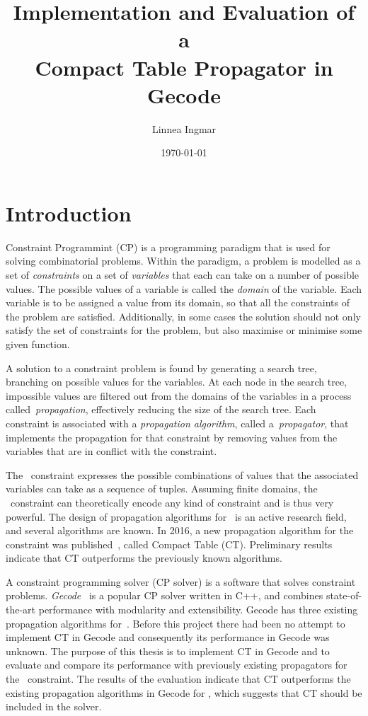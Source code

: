 \documentclass[a4paper,11pt]{article}
\title{\textbf{Implementation and Evaluation of a\\
    Compact Table Propagator in Gecode
  }
}
\author{Linnea Ingmar} %
\date{\today}
\newcommand{\Table}{\Constraint{Table}}
\newcommand{\CTpaper}[0]{DBLP:conf/cp/DemeulenaereHLP16}
\numberwithin{equation}{section}
\begin{document}
\maketitle

\tableofcontents

\newpage

\section{Introduction}
\label{intro}


Constraint Programmint (CP) is a programming paradigm that is used for solving
combinatorial problems. Within the paradigm, a problem is
modelled as a set of \emph{constraints} on a
set of \emph{variables} that each can take on a number of
possible values. The possible values of 
a variable is called the \emph{domain} of the variable.
Each variable is to be assigned a value
from its domain, so that all the constraints of the problem
are satisfied. Additionally, in some cases the solution should not only
satisfy the set of constraints for the
problem, but also maximise or minimise some given function.


A solution to a constraint problem is found by generating a search
tree, branching on possible values for the variables. At each node
in the search tree, impossible values are filtered out from the domains
of the variables in a process called~\emph{propagation}, effectively
reducing the size of the search tree.
Each constraint is associated with a \emph{propagation algorithm},
called a~\emph{propagator},
that implements the propagation for that constraint by removing
values from the variables that are in conflict with the constraint.

The \Table~constraint expresses the possible combinations of values
that the associated variables can take as a sequence of tuples.
Assuming finite domains, the \Table~constraint can theoretically
encode any kind of constraint and is thus very powerful. 
The design of propagation algorithms for \Table~is an active research field,
and several algorithms are known. In 2016, a new propagation algorithm for the \Table
constraint was published~\cite{\CTpaper}, called Compact Table (CT).
Preliminary results indicate that CT outperforms the previously known algorithms.

A constraint programming solver (CP solver) is a software that solves constraint problems.
\emph{Gecode}~\cite{Gecode} is a popular CP solver written in C++, and combines
state-of-the-art performance with modularity and extensibility.
Gecode has three existing propagation algorithms for~\Table.
Before this project there had been no attempt to implement CT in Gecode
and consequently its performance in Gecode was unknown. 
The purpose of this thesis is to implement CT in Gecode and to evaluate
and compare its performance with previously existing propagators for
the \Table~constraint.
The results of the evaluation indicate that CT outperforms
the existing propagation algorithms in Gecode for \Table,
which suggests that CT should be included in the solver.
\end{document}
